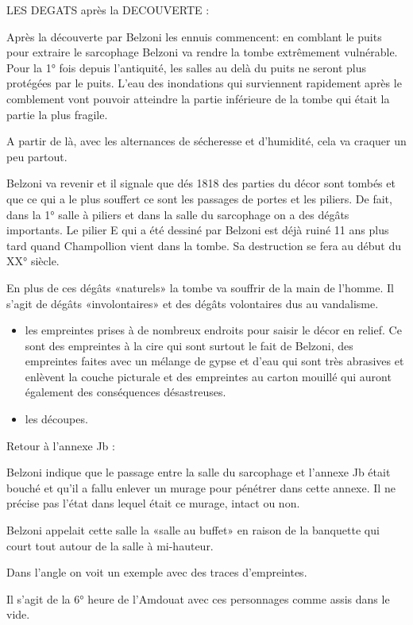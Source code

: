 \documentclass{article}
\begin{document}
LES DEGATS après la DECOUVERTE :

Après la découverte par Belzoni les ennuis commencent: en comblant le
puits pour extraire le sarcophage Belzoni va rendre la tombe
extrêmement vulnérable. Pour la 1° fois depuis l’antiquité, les salles
au delà du puits ne seront plus protégées par le puits. L’eau des
inondations qui surviennent rapidement après le comblement vont pouvoir
atteindre la partie inférieure de la tombe qui était la partie la plus
fragile. 

A partir de là, avec les alternances de sécheresse et d’humidité, cela
va craquer un peu partout. 

Belzoni va revenir et il signale que dés 1818 des parties du décor sont
tombés et que ce qui a le plus souffert ce sont les passages de portes
et les piliers. De fait, dans la 1° salle à piliers et dans la salle du
sarcophage on a des dégâts importants. Le pilier E qui a été dessiné
par Belzoni est déjà ruiné 11 ans plus tard quand Champollion vient
dans la tombe. Sa destruction se fera au début du XX° siècle.

En plus de ces dégâts «naturels» la tombe va souffrir de la main de
l’homme. Il s’agit de dégâts «involontaires» et des dégâts volontaires
dus au vandalisme.

\begin{itemize}
\item les empreintes prises à de nombreux endroits pour saisir le décor
en relief. Ce sont des empreintes à la cire qui sont surtout le fait de
Belzoni, des empreintes faites avec un mélange de gypse et d’eau qui
sont très abrasives et enlèvent la couche picturale et des empreintes
au carton mouillé qui auront également des conséquences désastreuses. 
\item  les découpes.
\end{itemize}
Retour à l’annexe Jb : 

Belzoni indique que le passage entre la salle du sarcophage et l’annexe
Jb était bouché et qu’il a fallu enlever un murage pour pénétrer dans
cette annexe. Il ne précise pas l’état dans lequel était ce murage,
intact ou non. 

Belzoni appelait cette salle la «salle au buffet» en raison de la
banquette qui court tout autour de la salle à mi-hauteur. 

Dans l’angle on voit un exemple avec des traces d’empreintes.

 Il s’agit de la 6° heure de l’Amdouat avec ces personnages comme assis
dans le vide. 
\end{document}
